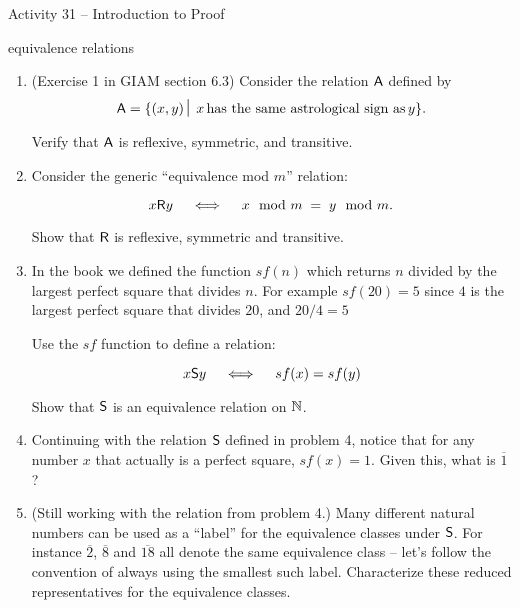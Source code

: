 \documentclass{amsart}
\begin{document}
\thispagestyle{empty}

\centerline{\Large Activity 31 -- Introduction to Proof}
\centerline{\large equivalence relations}

\bigskip
\Large


\begin{enumerate}
	
\item (Exercise 1 in GIAM section 6.3) Consider the relation $\mbox{\textsf A}$ defined by 
\[ \relA = \{ (x,y) \suchthat \; x \, \mbox{has the same astrological sign as} \, y \}. \]


Verify that $\mbox{\textsf A}$ is reflexive, symmetric, and transitive.

\vfill

\vfill

\newpage

\item Consider the generic ``equivalence mod $m$'' relation:

\[ x \mbox{\textsf R} y \quad \iff \quad x \mod{m} \; = \; y \mod{m} . \]

Show that $\mbox{\textsf R}$ is reflexive, symmetric and transitive.  

\vfill

\newpage


\item In the book we defined the function $sf(n)$ which returns $n$ divided by the largest perfect square that divides $n$.  For example $sf(20) = 5$ since $4$ is the largest perfect square that divides $20$, and $20/4 = 5$ 

Use the $sf$ function to define a relation:

\[ x \mbox{\textsf S} y \quad \iff \quad sf(x) = sf(y) \]

Show that $\mbox{\textsf S}$ is an equivalence relation on ${\mathbb N}$.

\vfill 

\newpage

\item Continuing with the relation $\mbox{\textsf S}$ defined in problem 4, notice that for any number $x$ that actually is a perfect square, $sf(x) = 1$.  Given this, what is $\overline{1}$?

\vfill


\item (Still working with the relation from problem 4.)  Many different natural numbers can be used as a ``label'' for the equivalence classes under $\mbox{\textsf S}$.  For instance $\overline{2}$, $\overline{8}$ and $\overline{18}$ all denote the same equivalence class -- let's follow the convention of always using the smallest such label.  Characterize these reduced representatives for the equivalence classes.


\end{enumerate}
\end{document}
